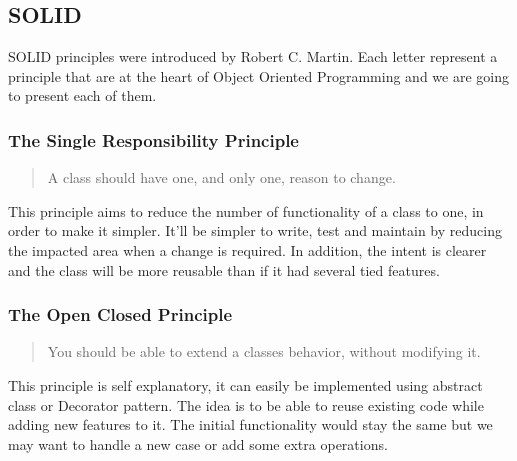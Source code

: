 \subsection{SOLID}\label{subsec:solid}
SOLID principles were introduced by Robert C. Martin.
Each letter represent a principle that are at the heart of Object
Oriented Programming and we are going to present each of them.

\subsubsection{The Single Responsibility Principle}
\begin{quotation}
    A class should have one, and only one, reason to change.
\end{quotation}
This principle aims to reduce the number of functionality of a class to
one, in order to make it simpler.
It'll be simpler to write, test and maintain by reducing the impacted
area when a change is required.
In addition, the intent is clearer and the class will be more
reusable than if it had several tied features.

\subsubsection{The Open Closed Principle}
\begin{quotation}
    You should be able to extend a classes behavior, without modifying
    it.
\end{quotation}
This principle is self explanatory, it can easily be implemented using
abstract class or Decorator pattern.
The idea is to be able to reuse existing code while adding new features
to it.
The initial functionality would stay the same but we may want to handle a
new case or add some extra operations.


